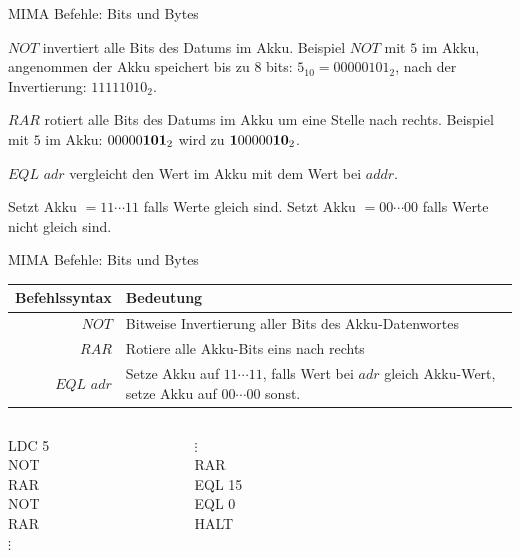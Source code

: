 \documentclass[handout]{beamer}
\begin{document}
\begin{frame}{MIMA Befehle: Bits und Bytes }
	\begin{itemize}
		\pitem $NOT$ invertiert alle Bits des Datums im Akku. \ip Beispiel $NOT$ mit $5$ im Akku, angenommen der Akku speichert bis zu 8 bits\ip : $5_{10} = 00000101_2$, nach der Invertierung: $1111 1010_2$.
		
		\pitem $RAR$ rotiert alle Bits des Datums im Akku um eine Stelle nach rechts. \ip Beispiel mit $5$ im Akku: $00000\textbf{101}_2$ wird zu $\textbf{1}00000\textbf{10}_2$.
		
		\pitem $EQL$ $adr$ vergleicht den Wert im Akku mit dem Wert bei $addr$.
		\begin{itemize}
			\pitem Setzt Akku $= 11\cdots 11$ falls Werte gleich sind.
			\pitem Setzt Akku $= 00\cdots 00$ falls Werte nicht gleich sind.
		\end{itemize}
	\end{itemize}
\end{frame}
	
\begin{frame}{MIMA Befehle: Bits und Bytes }
	\begin{tabular}{r | p{8cm} }
		Befehlssyntax & Bedeutung\\\hline\hline 
		$NOT$ & Bitweise Invertierung aller Bits des Akku-Datenwortes\\\hline
		$RAR$ & Rotiere alle Akku-Bits eins nach rechts\\\hline
		$EQL$ $adr$ & Setze Akku auf $11\cdots11$, falls Wert bei $adr$ gleich Akku-Wert, setze Akku auf $00\cdots00$ sonst.\\\hline
	\end{tabular}
	
	\bp 
	\vspace{.5cm}
	\vspace{.2cm}
	
	\begin{columns}
		\begin{column}{0.25\textwidth}
			LDC 5 \\ NOT \\ RAR \\ NOT \\ RAR \\ $\vdots$
		\end{column}
		\begin{column}{0.25\textwidth}
			$\vdots$ \\ RAR \\ EQL 15 \\ EQL 0 \\ HALT
		\end{column}
		
		\begin{column}{0.5\textwidth}
		\end{column}
	\end{columns}
\end{frame}
\end{document}
